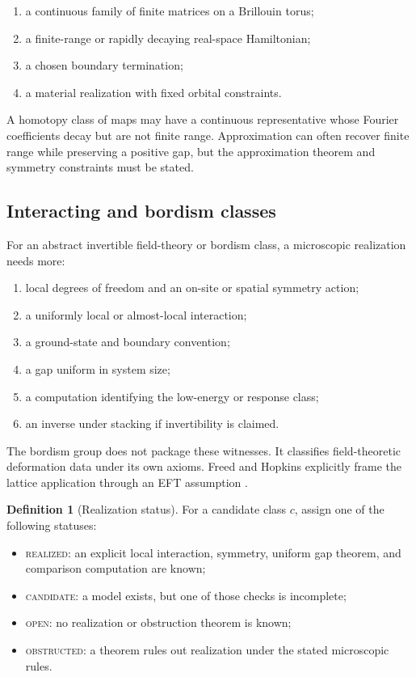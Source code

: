 \documentclass[12pt]{article}
\theoremstyle{definition}
\newtheorem{definition}[theorem]{Definition}
\theoremstyle{remark}
\newcommand{\status}[1]{\textsc{#1}}
\begin{document}
\begin{enumerate}[label=(\alph*)]
  \item a continuous family of finite matrices on a Brillouin torus;
  \item a finite-range or rapidly decaying real-space Hamiltonian;
  \item a chosen boundary termination;
  \item a material realization with fixed orbital constraints.
\end{enumerate}

A homotopy class of maps may have a continuous representative whose Fourier
coefficients decay but are not finite range.
Approximation can often recover finite range while preserving a positive gap,
but the approximation theorem and symmetry constraints must be stated.

\subsection{Interacting and bordism classes}

For an abstract invertible field-theory or bordism class, a microscopic
realization needs more:

\begin{enumerate}[label=(\roman*)]
  \item local degrees of freedom and an on-site or spatial symmetry action;
  \item a uniformly local or almost-local interaction;
  \item a ground-state and boundary convention;
  \item a gap uniform in system size;
  \item a computation identifying the low-energy or response class;
  \item an inverse under stacking if invertibility is claimed.
\end{enumerate}

The bordism group does not package these witnesses.
It classifies field-theoretic deformation data under its own axioms.
Freed and Hopkins explicitly frame the lattice application through an EFT
assumption \cite{FreedHopkins2021}.

\begin{definition}[Realization status]
For a candidate class $c$, assign one of the following statuses:
\begin{itemize}
  \item \status{realized}: an explicit local interaction, symmetry, uniform
  gap theorem, and comparison computation are known;
  \item \status{candidate}: a model exists, but one of those checks is
  incomplete;
  \item \status{open}: no realization or obstruction theorem is known;
  \item \status{obstructed}: a theorem rules out realization under the stated
  microscopic rules.
\end{itemize}
\end{definition}
\end{document}
